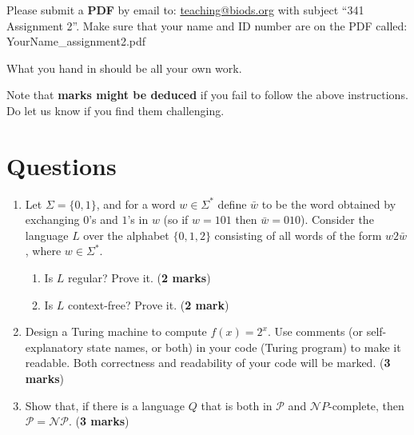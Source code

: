 \documentclass{article}
\begin{document}

Please submit a {\bf PDF} by email to: \href{mailto:teaching@biods.org}{teaching@biods.org} with subject ``341 Assignment 2''.
Make sure that your name and ID number are on the PDF called: YourName\_assignment2.pdf

What you hand in should be all your own work.

Note that \textbf{marks might be deduced} if you fail to follow the above instructions.
Do let us know if you find them challenging.

\section*{Questions}

\begin{enumerate}
\item Let $\Sigma = \{0, 1\}$, and for a word $w \in \Sigma^*$ define $\bar{w}$ to be the word obtained by exchanging $0$'s and $1$'s in $w$ (so if $w = 101$ then $\bar{w} = 010$).
Consider the language $L$ over the alphabet $\{0, 1, 2\}$ consisting of all words of the form $w 2 \bar{w}$, where $w \in
\Sigma^*$.
\begin{enumerate}
\item Is $L$ regular? Prove it. (\textbf{2 marks})
\item Is $L$ context-free? Prove it. (\textbf{2 mark})
\end{enumerate}

\item Design a Turing machine to compute $f(x) = 2^x$.
Use comments (or self-explanatory state names, or both) in your code (Turing program) to make it readable.
Both correctness and readability of your code will be marked. (\textbf{3 marks})

\item Show that, if there is a language $Q$ that is both in $\mathcal P$ and $\mathcal NP$-complete, then $\mathcal P = \mathcal{NP}$. (\textbf{3 marks})
\end{enumerate}
\end{document}
